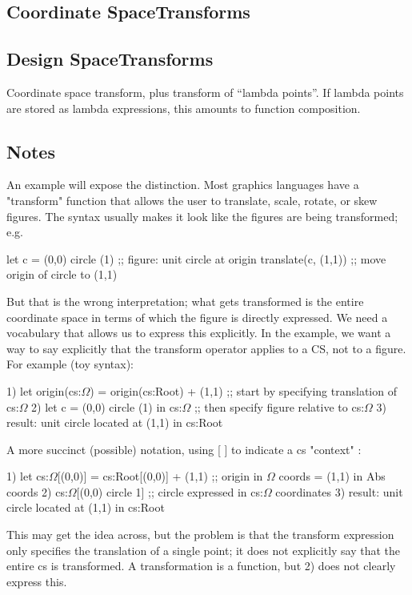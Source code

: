 \documentclass[12pt]{tufte-handout}
\numberwithin{equation}{subsection}
\numberwithin{equation}{subsection}
\newcommand\Cspace{Coordinate space}
\newcommand\CSpace{Coordinate Space}
\newcommand\DSpace{Design Space}
\begin{document}
  \subsection{\CSpace Transforms}

  \subsection{\DSpace Transforms}
  \label{subs:}

  \Cspace{} transform, plus transform of ``lambda points''.  If lambda points are stored as lambda expressions, this amounts to function composition.

  \subsection{Notes}

  An example will expose the distinction.  Most graphics languages have
  a "transform" function that allows the user to translate, scale,
  rotate, or skew figures.  The syntax usually makes it look like the
  figures are being transformed; e.g.

  let c = (0,0) circle (1)  ;; figure: unit circle at origin
  translate(c, (1,1))	      ;; move origin of circle to (1,1)

  But that is the wrong interpretation; what gets transformed is the
  entire coordinate space in terms of which the figure is directly
  expressed.  We need a vocabulary that allows us to express this
  explicitly.  In the example, we want a way to say explicitly that the
  transform operator applies to a CS, not to a figure.  For example (toy syntax):

  1)	  let origin(cs:$\Omega$) = origin(cs:Root) + (1,1)  ;; start by specifying translation of cs:$\Omega$
  2)	  let c = (0,0) circle (1) in cs:$\Omega$  ;; then specify figure relative to cs:$\Omega$
  3)	  result: unit circle located at (1,1) in cs:Root

  A more succinct (possible) notation, using [ ] to indicate a cs "context" :

  1)	  let cs:$\Omega$[(0,0)] = cs:Root[(0,0)] + (1,1)  ;; origin in $\Omega$ coords = (1,1) in Abs coords
  2)	  cs:$\Omega$[(0,0) circle 1]   ;; circle expressed in cs:$\Omega$ coordinates
  3)	  result: unit circle located at (1,1) in cs:Root

  This may get the idea across, but the problem is that the transform
  expression only specifies the translation of a single point; it does
  not explicitly say that the entire cs is transformed.  A
  transformation is a function, but 2) does not clearly express this.
\end{document}
